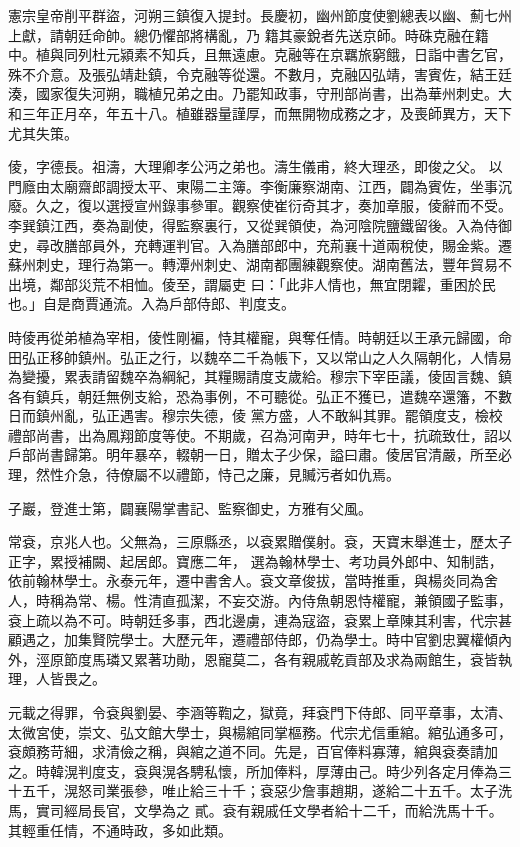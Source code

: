 \begin{pinyinscope}
 憲宗皇帝削平群盜，河朔三鎮復入提封。長慶初，幽州節度使劉總表以幽、薊七州上獻，請朝廷命帥。總仍懼部將構亂，乃
 籍其豪銳者先送京師。時硃克融在籍中。植與同列杜元潁素不知兵，且無遠慮。克融等在京羈旅窮餓，日詣中書乞官，殊不介意。及張弘靖赴鎮，令克融等從還。不數月，克融囚弘靖，害賓佐，結王廷湊，國家復失河朔，職植兄弟之由。乃罷知政事，守刑部尚書，出為華州刺史。大和三年正月卒，年五十八。植雖器量謹厚，而無開物成務之才，及喪師異方，天下尤其失策。



 倰，字德長。祖濤，大理卿孝公沔之弟也。濤生儀甫，終大理丞，即俊之父。
 以門廕由太廟齋郎調授太平、東陽二主簿。李衡廉察湖南、江西，闢為賓佐，坐事沉廢。久之，復以選授宣州錄事參軍。觀察使崔衍奇其才，奏加章服，倰辭而不受。李巽鎮江西，奏為副使，得監察裏行，又從巽領使，為河陰院鹽鐵留後。入為侍御史，尋改膳部員外，充轉運判官。入為膳部郎中，充荊襄十道兩稅使，賜金紫。遷蘇州刺史，理行為第一。轉潭州刺史、湖南都團練觀察使。湖南舊法，豐年貿易不出境，鄰部災荒不相恤。倰至，謂屬吏
 曰：「此非人情也，無宜閉糶，重困於民也。」自是商賈通流。入為戶部侍郎、判度支。



 時倰再從弟植為宰相，倰性剛褊，恃其權寵，與奪任情。時朝廷以王承元歸國，命田弘正移帥鎮州。弘正之行，以魏卒二千為帳下，又以常山之人久隔朝化，人情易為變擾，累表請留魏卒為綱紀，其糧賜請度支歲給。穆宗下宰臣議，倰固言魏、鎮各有鎮兵，朝廷無例支給，恐為事例，不可聽從。弘正不獲已，遣魏卒還籓，不數日而鎮州亂，弘正遇害。穆宗失德，倰
 黨方盛，人不敢糾其罪。罷領度支，檢校禮部尚書，出為鳳翔節度等使。不期歲，召為河南尹，時年七十，抗疏致仕，詔以戶部尚書歸第。明年暴卒，輟朝一日，贈太子少保，謚曰肅。倰居官清嚴，所至必理，然性介急，待僚屬不以禮節，恃己之廉，見贓污者如仇焉。



 子巖，登進士第，闢襄陽掌書記、監察御史，方雅有父風。



 常袞，京兆人也。父無為，三原縣丞，以袞累贈僕射。袞，天寶末舉進士，歷太子正字，累授補闕、起居郎。寶應二年，
 選為翰林學士、考功員外郎中、知制誥，依前翰林學士。永泰元年，遷中書舍人。袞文章俊拔，當時推重，與楊炎同為舍人，時稱為常、楊。性清直孤潔，不妄交游。內侍魚朝恩恃權寵，兼領國子監事，袞上疏以為不可。時朝廷多事，西北邊虜，連為寇盜，袞累上章陳其利害，代宗甚顧遇之，加集賢院學士。大歷元年，遷禮部侍郎，仍為學士。時中官劉忠翼權傾內外，涇原節度馬璘又累著功勛，恩寵莫二，各有親戚乾貢部及求為兩館生，袞皆執
 理，人皆畏之。



 元載之得罪，令袞與劉晏、李涵等鞫之，獄竟，拜袞門下侍郎、同平章事，太清、太微宮使，崇文、弘文館大學士，與楊綰同掌樞務。代宗尤信重綰。綰弘通多可，袞頗務苛細，求清儉之稱，與綰之道不同。先是，百官俸料寡薄，綰與袞奏請加之。時韓滉判度支，袞與滉各騁私懷，所加俸料，厚薄由己。時少列各定月俸為三十五千，滉怒司業張參，唯止給三十千；袞惡少詹事趙期，遂給二十五千。太子洗馬，實司經局長官，文學為之
 貳。袞有親戚任文學者給十二千，而給洗馬十千。其輕重任情，不通時政，多如此類。




\end{pinyinscope}
